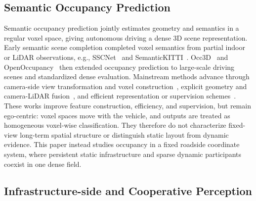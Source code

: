 \subsection{Semantic Occupancy Prediction}
\label{sec:related_occupancy}

Semantic occupancy prediction jointly estimates geometry and semantics in a
regular voxel space, giving autonomous driving a dense 3D scene representation.
Early semantic scene completion completed voxel semantics from partial indoor or
LiDAR observations, e.g., SSCNet~\cite{SSCNet} and
SemanticKITTI~\cite{SemanticKITTI}. Occ3D~\cite{Occ3D} and
OpenOccupancy~\cite{OpenOccupancy} then extended occupancy prediction to
large-scale driving scenes and standardized dense evaluation. Mainstream methods
advance through camera-side view transformation and voxel
construction~\cite{BEVDet,BEVDepth,BEVFormer,TPVFormer,COTR,FBOCC,PanoOcc},
explicit geometry and camera-LiDAR fusion~\cite{VoxelNet,PointPillars,
BEVFusion,OccFormer,SurroundOcc}, and efficient representation or supervision
schemes~\cite{SparseOcc,LowRankOcc,SelfOcc,RenderOcc,GaussianFormer,
GaussianFormer2,OccMamba,OccWorld,UniOcc}. These works improve feature
construction, efficiency, and supervision, but remain ego-centric: voxel spaces
move with the vehicle, and outputs are treated as homogeneous voxel-wise
classification. They therefore do not characterize fixed-view long-term spatial
structure or distinguish static layout from dynamic evidence. This paper instead
studies occupancy in a fixed roadside coordinate system, where persistent static
infrastructure and sparse dynamic participants coexist in one dense field.

\subsection{Infrastructure-side and Cooperative Perception}
\label{sec:related_infrastructure}

